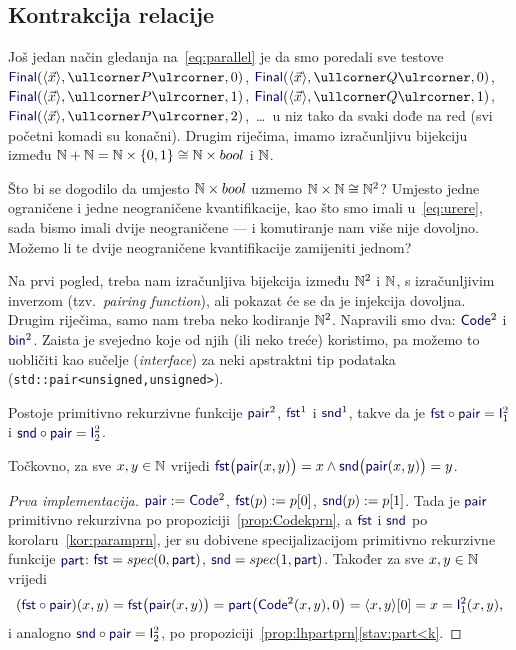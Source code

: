 \subsection{Kontrakcija relacije}

Još jedan način gledanja na~\eqref{eq:parallel} je da smo poredali sve testove $\f{Final}(\kr{\vec x},\kprog P,0)$, $\f{Final}(\kr{\vec x},\kprog Q,0)$, $\f{Final}(\kr{\vec x},\kprog P,1)$, $\f{Final}(\kr{\vec x},\kprog Q,1)$, 
$\f{Final}(\kr{\vec x},\kprog P,2)$,~\ldots\ u niz tako da svaki dođe na red (svi početni komadi su konačni). Drugim riječima, imamo izračunljivu bijekciju između ${\mathbb N}+{\mathbb N}={\mathbb N}\times\{0,1\}\cong{\mathbb N}\times bool$ i ${\mathbb N}$.

Što bi se dogodilo da umjesto ${\mathbb N}\times bool$ uzmemo ${\mathbb N}\times{\mathbb N}\cong{\mathbb N}^2$? Umjesto jedne ograničene i jedne neograničene kvantifikacije, kao što smo imali u~\eqref{eq:urere}, sada bismo imali dvije neograničene --- i komutiranje nam više nije dovoljno. Možemo li te dvije neograničene kvantifikacije zamijeniti jednom?

Na prvi pogled, treba nam izračunljiva bijekcija između ${\mathbb N}^2$ i ${\mathbb N}$, s izračunljivim inverzom (tzv.\ \emph{pairing function}), ali pokazat će se da je injekcija dovoljna. Drugim riječima, samo nam treba neko kodiranje ${\mathbb N}^2$. Napravili smo dva: $\f{Code}^2$ i $\f{bin}^2$. Zaista je svejedno koje od njih (ili neko treće) koristimo, pa možemo to uobličiti kao sučelje (\emph{interface}) za neki apstraktni tip podataka (\texttt{std::pair<unsigned,unsigned>}).

\begin{lema}[{name=[primitivna rekurzivnost kodiranja i dekodiranja parova brojeva]}]\label{lm:pairfstsndprn}
Postoje primitivno rekurzivne funkcije $\f{pair}^2$, $\f{fst}^1$ i $\f{snd}^1$, takve da je $\f{fst}\circ\f{pair}=\f I_1^2$ i $\f{snd}\circ\f{pair}=\f I_2^2$.
\end{lema}
Točkovno, za sve $x,y\in{\mathbb N}$ vrijedi $\f{fst}\bigl(\f{pair}(x,y)\bigr)=x\land\f{snd}\bigl(\f{pair}(x,y)\bigr)=y$.
\begin{proof}[Prva implementacija]
    $\f{pair}:=\f{Code}^2$, $\f{fst}(p):=p[0]$, $\f{snd}(p):=p[1]$. Tada je $\f{pair}$ primitivno rekurzivna po propoziciji~\ref{prop:Codekprn}, a $\f{fst}$ i $\f{snd}$ po korolaru~\ref{kor:paramprn}, jer su dobivene specijalizacijom primitivno rekurzivne funkcije $\f{part}$: $\f{fst}=spec(0,\f{part})$, $\f{snd}=spec(1,\f{part})$. Također za sve $x,y\in{\mathbb N}$ vrijedi
\begin{equation}
    (\f{fst}\circ\f{pair})(x,y)=\f{fst}\bigl(\f{pair}(x,y)\bigr)=\f{part}\bigl(\f{Code}^2(x,y),0\bigr)=\kr{x,y}[0]=x=\f I_1^2(x,y)\text,
\end{equation}
i analogno $\f{snd}\circ\f{pair}=\f I_2^2$, po propoziciji~\ref{prop:lhpartprn}\eqref{stav:part<k}.
\end{proof}

